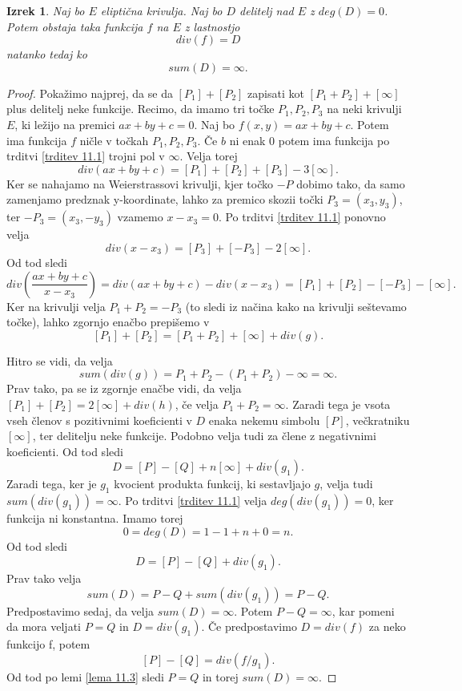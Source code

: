 \documentclass[12pt,a4paper,twoside]{article}
\theoremstyle{definition} %
\theoremstyle{plain} %
\newtheorem{izrek}[definicija]{Izrek}
\numberwithin{equation}{section}  %
\begin{document}
\begin{izrek}
\label{izrek 11.2}
Naj bo $E$ eliptična krivulja. Naj bo $D$ delitelj nad $E$ z $deg(D) = 0$. Potem obstaja taka funkcija $f$ na $E$ z lastnostjo
$$div(f) = D$$
natanko tedaj ko
$$sum(D) = \infty.$$

\end{izrek}

\begin{proof}

Pokažimo najprej, da se da $[P_1]+ [P_2]$ zapisati kot $[P_1+P_2] + [\infty]$ plus delitelj neke funkcije.
Recimo, da imamo tri točke $P_1,P_2,P_3$ na neki krivulji $E$, ki ležijo na premici $ax+by+c = 0$.
Naj bo $f(x,y) = ax+by+c$. Potem ima funkcija $f$ ničle v točkah $P_1,P_2,P_3$. Če $b$ ni enak $0$ potem ima funkcija po trditvi \ref{trditev 11.1} trojni pol v $\infty$.
Velja torej $$div(ax+by+c) = [P_1]+[P_2]+[P_3]-3[\infty].$$
Ker se nahajamo na Weierstrassovi krivulji, kjer točko $-P$ dobimo tako, da samo zamenjamo predznak y-koordinate, lahko za premico skozii točki $P_3 = (x_3,y_3)$, ter $-P_3=(x_3,-y_3)$ vzamemo $x-x_3=0$.
Po  trditvi \ref{trditev 11.1} ponovno velja
$$div(x-x_3) = [P_3]+[-P_3]-2[\infty].$$
Od tod sledi
$$div\left( \frac{ax+by+c}{x-x_3}\right) = div(ax+by+c) - div(x-x_3) =[P_1]+[P_2]-[-P_3]-[\infty].$$
Ker na krivulji velja $P_1+P_2 = -P_3$ (to sledi iz načina kako na krivulji seštevamo točke), lahko zgornjo enačbo prepišemo v 
$$[P_1]+[P_2] = [P_1+P_2]+[\infty]+div(g).$$ 


Hitro se vidi, da velja
$$sum(div(g))= P_1+P_2-(P_1+P_2)-\infty = \infty.$$
Prav tako, pa se iz zgornje enačbe vidi, da velja $[P_1]+[P_2] = 2[\infty] + div(h)$, če velja $P_1+P_2 = \infty$. Zaradi tega je vsota vseh členov s pozitivnimi koeficienti v $D$ enaka nekemu simbolu $[P]$, večkratniku $[\infty]$, ter delitelju neke funkcije. Podobno velja tudi za člene z negativnimi koeficienti. Od tod sledi
$$D = [P]-[Q]+n[\infty]+div(g_1).$$
Zaradi tega, ker je $g_1$ kvocient produkta funkcij, ki sestavljajo $g$, velja tudi
\newline $sum(div(g_1))= \infty$. Po trditvi \ref{trditev 11.1} velja $deg(div(g_1))=0$, ker funkcija ni konstantna. Imamo torej $$0 = deg(D) = 1-1+n+0=n.$$
Od tod sledi
$$D = [P]-[Q] + div(g_1).$$
Prav tako velja
$$sum(D) = P-Q+sum(div(g_1)) = P-Q.$$
Predpostavimo sedaj, da velja $sum(D) = \infty$. Potem $P-Q = \infty$, kar pomeni da mora veljati $P=Q$ in $D = div(g_1)$. Če predpostavimo $D = div(f)$ za neko funkcijo f, potem
$$[P]-[Q] = div(f/g_1).$$
Od tod po lemi \ref{lema 11.3} sledi $P = Q$ in torej $sum(D) = \infty$.

\end{proof}
\end{document}
